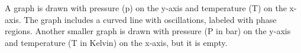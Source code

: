 A graph is drawn with pressure (p) on the y-axis and temperature (T) on the x-axis. The graph includes a curved line with oscillations, labeled with phase regions. Another smaller graph is drawn with pressure (P in bar) on the y-axis and temperature (T in Kelvin) on the x-axis, but it is empty.